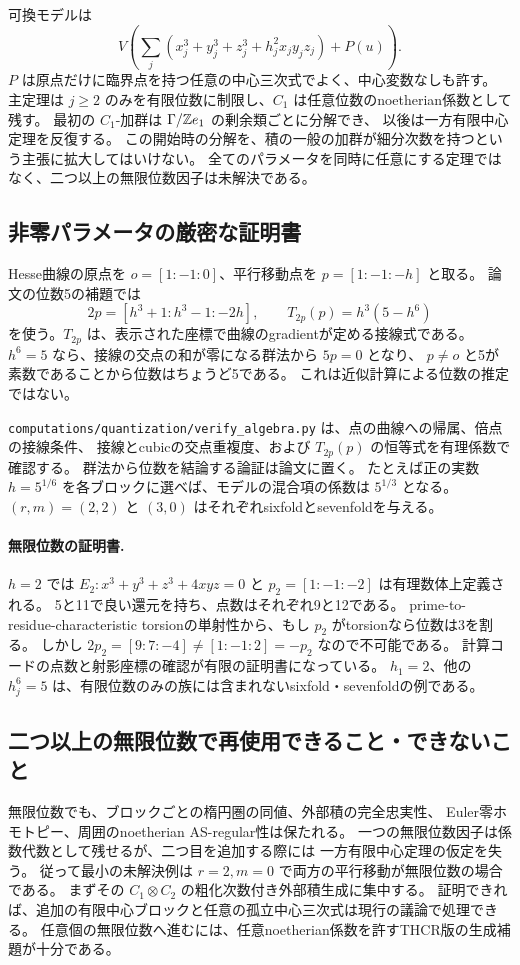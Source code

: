 可換モデルは
\[
 V\!\left(\sum_j(x_j^3+y_j^3+z_j^3+h_j^2x_jy_jz_j)+P(u)\right).
\]
\(P\) は原点だけに臨界点を持つ任意の中心三次式でよく、中心変数なしも許す。
主定理は \(j\ge2\) のみを有限位数に制限し、\(C_1\) は任意位数のnoetherian係数として残す。
最初の \(C_1\)-加群は \(\Gamma/\mathbb Z e_1\) の剰余類ごとに分解でき、
以後は一方有限中心定理を反復する。
この開始時の分解を、積の一般の加群が細分次数を持つという主張に拡大してはいけない。
全てのパラメータを同時に任意にする定理ではなく、二つ以上の無限位数因子は未解決である。

\subsection{非零パラメータの厳密な証明書}

Hesse曲線の原点を \(o=[1:-1:0]\)、平行移動点を \(p=[1:-1:-h]\) と取る。
論文の位数5の補題では
\[
 2p=[h^3+1:h^3-1:-2h],\qquad
 T_{2p}(p)=h^3(5-h^6)
\]
を使う。\(T_{2p}\) は、表示された座標で曲線のgradientが定める接線式である。
\(h^6=5\) なら、接線の交点の和が零になる群法から \(5p=0\) となり、
\(p\ne o\) と5が素数であることから位数はちょうど5である。
これは近似計算による位数の推定ではない。

\texttt{computations/quantization/verify\_algebra.py} は、点の曲線への帰属、倍点の接線条件、
接線とcubicの交点重複度、および \(T_{2p}(p)\) の恒等式を有理係数で確認する。
群法から位数を結論する論証は論文に置く。
たとえば正の実数 \(h=5^{1/6}\) を各ブロックに選べば、モデルの混合項の係数は \(5^{1/3}\) となる。
\((r,m)=(2,2)\) と \((3,0)\) はそれぞれsixfoldとsevenfoldを与える。

\paragraph{無限位数の証明書.}
\(h=2\) では \(E_2:x^3+y^3+z^3+4xyz=0\) と \(p_2=[1:-1:-2]\) は有理数体上定義される。
5と11で良い還元を持ち、点数はそれぞれ9と12である。
prime-to-residue-characteristic torsionの単射性から、もし \(p_2\) がtorsionなら位数は3を割る。
しかし \(2p_2=[9:7:-4]\ne[1:-1:2]=-p_2\) なので不可能である。
計算コードの点数と射影座標の確認が有限の証明書になっている。
\(h_1=2\)、他の \(h_j^6=5\) は、有限位数のみの族には含まれないsixfold・sevenfoldの例である。

\subsection{二つ以上の無限位数で再使用できること・できないこと}

無限位数でも、ブロックごとの楕円圏の同値、外部積の完全忠実性、
Euler零ホモトピー、周囲のnoetherian AS-regular性は保たれる。
一つの無限位数因子は係数代数として残せるが、二つ目を追加する際には
一方有限中心定理の仮定を失う。
従って最小の未解決例は \(r=2,m=0\) で両方の平行移動が無限位数の場合である。
まずその \(C_1\otimes C_2\) の粗化次数付き外部積生成に集中する。
証明できれば、追加の有限中心ブロックと任意の孤立中心三次式は現行の議論で処理できる。
任意個の無限位数へ進むには、任意noetherian係数を許すTHCR版の生成補題が十分である。

